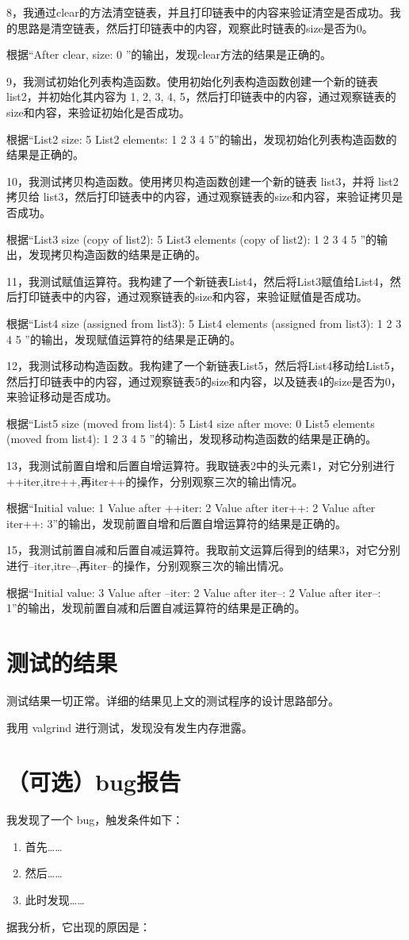 \documentclass[UTF8]{ctexart}
\begin{document}
8，我通过clear的方法清空链表，并且打印链表中的内容来验证清空是否成功。我的思路是清空链表，然后打印链表中的内容，观察此时链表的size是否为0。

根据“After clear, size: 0   ”的输出，发现clear方法的结果是正确的。

9，我测试初始化列表构造函数。使用初始化列表构造函数创建一个新的链表 list2，并初始化其内容为 {1, 2, 3, 4, 5}，然后打印链表中的内容，通过观察链表的size和内容，来验证初始化是否成功。

根据“List2 size: 5  List2 elements: 1 2 3 4 5”的输出，发现初始化列表构造函数的结果是正确的。

10，我测试拷贝构造函数。使用拷贝构造函数创建一个新的链表 list3，并将 list2 拷贝给 list3，然后打印链表中的内容，通过观察链表的size和内容，来验证拷贝是否成功。

根据“List3 size (copy of list2): 5  List3 elements (copy of list2): 1 2 3 4 5 ”的输出，发现拷贝构造函数的结果是正确的。

11，我测试赋值运算符。我构建了一个新链表List4，然后将List3赋值给List4，然后打印链表中的内容，通过观察链表的size和内容，来验证赋值是否成功。

根据“List4 size (assigned from list3): 5  List4 elements (assigned from list3): 1 2 3 4 5 ”的输出，发现赋值运算符的结果是正确的。

12，我测试移动构造函数。我构建了一个新链表List5，然后将List4移动给List5，然后打印链表中的内容，通过观察链表5的size和内容，以及链表4的size是否为0，来验证移动是否成功。

根据“List5 size (moved from list4): 5  List4 size after move: 0  List5 elements (moved from list4): 1 2 3 4 5 ”的输出，发现移动构造函数的结果是正确的。

13，我测试前置自增和后置自增运算符。我取链表2中的头元素1，对它分别进行++iter,itre++,再iter++的操作，分别观察三次的输出情况。

根据“Initial value: 1  Value after ++iter: 2  Value after iter++: 2  Value after iter++: 3”的输出，发现前置自增和后置自增运算符的结果是正确的。

15，我测试前置自减和后置自减运算符。我取前文运算后得到的结果3，对它分别进行--iter,itre--,再iter--的操作，分别观察三次的输出情况。

根据“Initial value: 3  Value after --iter: 2  Value after iter--: 2  Value after iter--: 1”的输出，发现前置自减和后置自减运算符的结果是正确的。

\section{测试的结果}

测试结果一切正常。详细的结果见上文的测试程序的设计思路部分。

我用 valgrind 进行测试，发现没有发生内存泄露。

\section{（可选）bug报告}

我发现了一个 bug，触发条件如下：

\begin{enumerate}
    \item 首先……
    \item 然后……
    \item 此时发现……
\end{enumerate}

据我分析，它出现的原因是：
\end{document}
